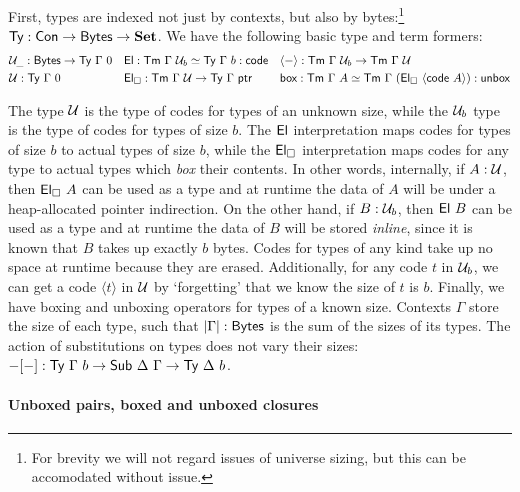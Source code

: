 First, types are indexed not just by contexts, but also by
bytes:\footnote{For brevity we will not regard issues of universe sizing, but this can
be accomodated without issue.} $\textsf{Ty} : \textsf{Con} \to \textsf{Bytes} \to \textbf{Set}$.
We have the following basic type and term formers:
{\small%
\[
\begin{alignedat}{3}
&\univ_{\_} : \Bytes \to \Ty\ \Gamma\ 0 \quad  &&\El : \Tm\ \Gamma\ \univ_b \simeq \Ty\ \Gamma\ b : \code \quad  &&\langle-\rangle : \Tm\ \Gamma\ \univ_b \to \Tm\ \Gamma\ \univ \\
&\univ : \Ty\ \Gamma\ 0 \quad &&\El_\square : \Tm\ \Gamma\ \univ \to \Ty\ \Gamma\ \ptr\quad  && \syn{box} : \Tm\ \Gamma\ A \simeq \Tm\ \Gamma\ (\El_\square\ \langle\code\ A\rangle) : \syn{unbox} \\
\end{alignedat}
\]}

The type \(\mathcal{U}\) is the type of codes for types of an unknown size, while the
\(\mathcal{U}_b\) type is the type of codes for types of size \(b\). The \(\textsf{El}\)
interpretation maps codes for types of size \(b\) to actual types of size \(b\),
while the \(\textsf{El}_\square\) interpretation maps codes for any type to actual types
which \emph{box} their contents. In other words, internally, if \(A : \mathcal{U}\),
then \(\textsf{El}_\square\ A\) can be used as a type and at runtime the data of \(A\)
will be under a heap-allocated pointer indirection. On the other hand, if \(B :
\mathcal{U}_b\), then \(\textsf{El}\ B\) can be used as a type and at runtime the data of
\(B\) will be stored \emph{inline}, since it is known that \(B\) takes up
exactly \(b\) bytes. Codes for types of any kind take up no space at runtime
because they are erased.
Additionally, for any code \(t\) in \(\mathcal{U}_b\), we can get a code
\(\langle t \rangle\) in \(\mathcal{U}\) by `forgetting' that we know the size
of \(t\) is \(b\). Finally, we have boxing and unboxing operators for types of a known size.
Contexts $\Gamma$ store the size of each type, such that $|\Gamma| : \textsf{Bytes}$ is the sum
of the sizes of its types. The action of
substitutions on types does not vary their sizes: $-[-] : \textsf{Ty}\ \Gamma\ b \to
\textsf{Sub}\ \Delta\ \Gamma \to \textsf{Ty}\ \Delta\ b$.

\paragraph{Unboxed pairs, boxed and unboxed closures}\label{function-types}

